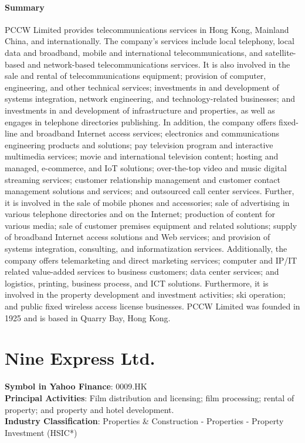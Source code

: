 \paragraph{Summary}
PCCW Limited provides telecommunications services in Hong Kong, Mainland China, and internationally. The company's services include local telephony, local data and broadband, mobile and international telecommunications, and satellite-based and network-based telecommunications services. It is also involved in the sale and rental of telecommunications equipment; provision of computer, engineering, and other technical services; investments in and development of systems integration, network engineering, and technology-related businesses; and investments in and development of infrastructure and properties, as well as engages in telephone directories publishing. In addition, the company offers fixed-line and broadband Internet access services; electronics and communications engineering products and solutions; pay television program and interactive multimedia services; movie and international television content; hosting and managed, e-commerce, and IoT solutions; over-the-top video and music digital streaming services; customer relationship management and customer contact management solutions and services; and outsourced call center services. Further, it is involved in the sale of mobile phones and accessories; sale of advertising in various telephone directories and on the Internet; production of content for various media; sale of customer premises equipment and related solutions; supply of broadband Internet access solutions and Web services; and provision of systems integration, consulting, and informatization services. Additionally, the company offers telemarketing and direct marketing services; computer and IP/IT related value-added services to business customers; data center services; and logistics, printing, business process, and ICT solutions. Furthermore, it is involved in the property development and investment activities; ski operation; and public fixed wireless access license businesses. PCCW Limited was founded in 1925 and is based in Quarry Bay, Hong Kong.


\section{Nine Express Ltd.}
\textbf{Symbol in Yahoo Finance}: 0009.HK\\
\textbf{Principal Activities}: Film distribution and licensing; film processing; rental of property; and property and hotel development.\\
\textbf{Industry Classification}: Properties \& Construction - Properties - Property Investment (HSIC*)